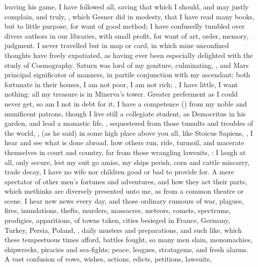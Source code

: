 leaving his game, I have followed all, saving that which I should, and may
justly complain, and truly, , which Gesner did in modesty, that
I have read many books, but to little purpose, for want of good method; I have
confusedly tumbled over divers authors in our libraries, with small profit, for
want of art, order, memory, judgment. I never travelled but in map or card, in
which mine unconfined thoughts have freely expatiated, as having ever been
especially delighted with the study of Cosmography. Saturn
was lord of my geniture, culminating, \etc{}, and Mars principal significator
of manners, in partile conjunction with my ascendant; both fortunate in their
houses, \etc{} I am not poor, I am not rich; , I
have little, I want nothing: all my treasure is in Minerva's tower. Greater
preferment as I could never get, so am I not in debt for it, I have a
competence () from my noble and munificent patrons,
though I live still a collegiate student, as Democritus in his garden, and lead
a monastic life, ,
sequestered from those tumults and troubles of the world, , (as he said) in some high place above you
all, like Stoicus Sapiens, , I hear and see what is done abroad, how others
run, ride, turmoil, and macerate themselves in court and
country, far from those wrangling lawsuits, : I laugh at all, only
secure, lest my suit go amiss, my ships perish, corn and cattle miscarry, trade
decay, I have no wife nor children good or bad to provide for. A mere spectator
of other men's fortunes and adventures, and how they act their parts, which
methinks are diversely presented unto me, as from a common theatre or scene. I
hear new news every day, and those ordinary rumours of war, plagues, fires,
inundations, thefts, murders, massacres, meteors, comets, spectrums, prodigies,
apparitions, of towns taken, cities besieged in France, Germany, Turkey,
Persia, Poland, \etc{}, daily musters and preparations, and such like, which
these tempestuous times afford, battles fought, so many men slain, monomachies,
shipwrecks, piracies and sea-fights; peace, leagues, stratagems, and fresh
alarms. A vast confusion of vows, wishes, actions, edicts, petitions, lawsuits,
